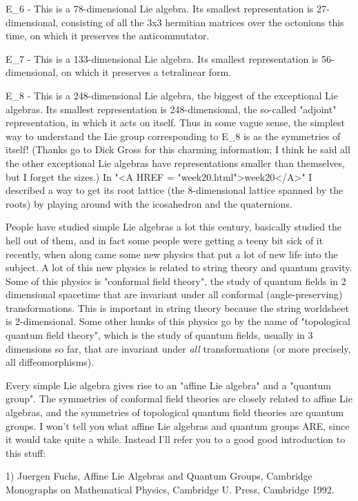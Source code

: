 E_{6} - This is a 78-dimensional Lie algebra.  Its smallest
representation is 27-dimensional, consisting of all the 3x3 hermitian
matrices over the octonions this time, on which it preserves the
anticommutator.  

E_{7} - This is a 133-dimensional Lie algebra.  Its smallest 
representation is 56-dimensional, on which it preserves a tetralinear
form. 

E_{8} - This is a 248-dimensional Lie algebra, the biggest
of the exceptional Lie algebras.  Its smallest representation is
248-dimensional, the so-called "adjoint" representation, in which it
acts on itself.  Thus in some vague sense, the simplest way to
understand the Lie group corresponding to E_{8} is as the
symmetries of itself!  (Thanks go to Dick Gross for this charming
information; I think he said all the other exceptional Lie algebras
have representations smaller than themselves, but I forget the sizes.)
In "<A HREF = "week20.html">week20</A>" I described a way to get its
root lattice (the 8-dimensional lattice spanned by the roots) by
playing around with the icosahedron and the quaternions.

People have studied simple Lie algebras a lot this century, basically
studied the hell out of them, and in fact some people were getting a
teeny bit sick of it recently, when along came some new physics that put
a lot of new life into the subject.  A lot of this new physics is
related to string theory and quantum gravity.  Some of this physics is
"conformal field theory", the study of quantum fields in 2 dimensional
spacetime that are invariant under all conformal (angle-preserving)
transformations.  This is important in string theory because the string
worldsheet is 2-dimensional.  Some other hunks of this physics go by the
name of "topological quantum field theory", which is the study of
quantum fields, usually in 3 dimensions so far, that are invariant under
\emph{all} transformations (or more precisely, all diffeomorphisms).

Every simple Lie algebra gives rise to an "affine Lie algebra" and
a "quantum group".   The symmetries of conformal field theories are
closely related to affine Lie algebras, and the symmetries of
topological quantum field theories are quantum groups.  I won't
tell you what affine Lie algebras and quantum groups ARE, since it
would take quite a while.  Instead I'll refer you to a good
good introduction to this stuff:  

1) Juergen Fuchs, Affine Lie Algebras and Quantum Groups, Cambridge
Monographs on Mathematical Physics, Cambridge U. Press, Cambridge 1992.

